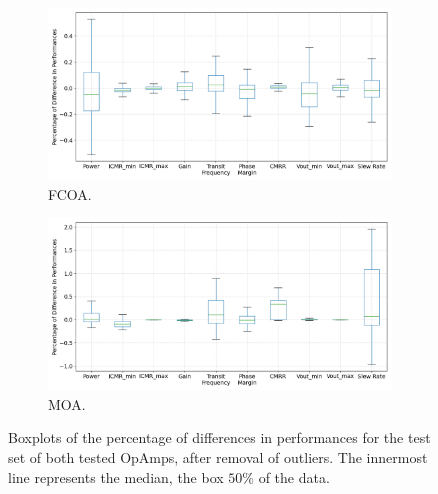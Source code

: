 \documentclass[conference]{IEEEtran}
\begin{document}
	\begin{figure}[]
		\begin{subfigure}{.5\textwidth}
			\centering
			\includegraphics[width=\linewidth]{figures/BoxplotFCA}
			\setlength{\abovecaptionskip}{0ex}%
			\setlength{\belowcaptionskip}{0ex}%
			\caption{FCOA.}
			\label{fig:boxplotfca}
		\end{subfigure}
		\hfill
		\begin{subfigure}{.5\textwidth}
			\centering
			\includegraphics[width=\linewidth]{figures/BoxplotMillerOpAmp}
			\setlength{\abovecaptionskip}{-0.5ex}%
			\caption{MOA.}
			\label{fig:boxplotmiller}
		\end{subfigure}
		\setlength{\abovecaptionskip}{3ex}%
		\setlength{\belowcaptionskip}{-4ex}%
		\caption{Boxplots of the percentage of differences in performances for the test set of both tested OpAmps, after removal of outliers. The innermost line represents the median, the box $50\%$ of the data. }
		\label{fig:boxplots}
	\end{figure}
	
\end{document}
